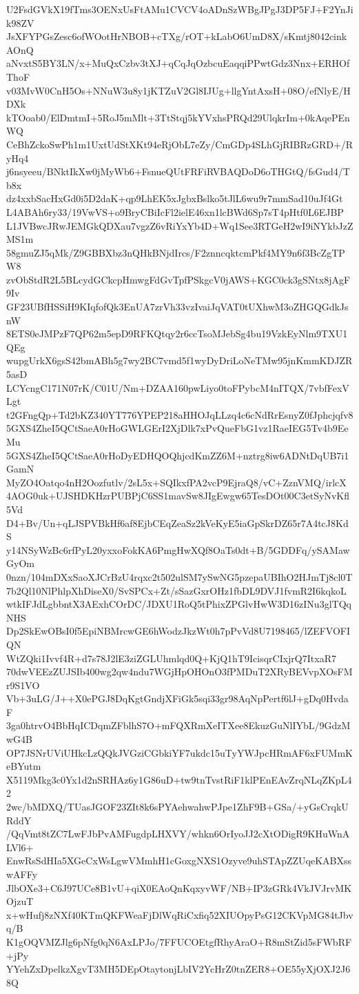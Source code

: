 U2FsdGVkX19fTms3OENxUsFtAMu1CVCV4oADnSzWBgJPgJ3DP5FJ+F2YnJik98ZV
JsXFYPGsZesc6ofWOotHrNBOB+cTXg/rOT+kLabO6UmD8X/sKmtj8042cinkAOnQ
aNvxtS5BY3LN/x+MuQxCzbv3tXJ+qCqJqOzbcuEaqqiPPwtGdz3Nnx+ERHOfThoF
v03MvW0CnH5Os+NNuW3u8y1jKTZuV2Gl8IJUg+llgYntAxsH+08O/efNlyE/HDXk
kTOoab0/ElDmtmI+5RoJ5mMlt+3TtStqj5kYVxhsPRQd29UlqkrIm+0kAqePEnWQ
CeBhZckoSwPh1m1UxtUdStXKt94eRjObL7eZy/CmGDp4SLhGjRIBRzGRD+/RyHq4
j6nsyeeu/BNktIkXw0jMyWb6+FsnueQUtFRFiRVBAQDoD6oTHGtQ/fsGud4/Tb8x
dz4xxbSacHxGd0i5D2daK+qp9LhEK5xJgbxBslko5tJlL6wu9r7mmSad10uJf4Gt
L4ABAh6ry33/19VwVS+o9BryCBiIcFl2ielE46xn1lcBWd6Sp7sT4pHtf0L6EJBP
L1JVBwcJRwJEMGkQDXau7vgzZ6vRiYxYb4D+Wq1See3RTGeH2wI9iNYkbJzZMS1m
58gmuZJ5qMk/Z9GBBXbz3nQHkBNjdIrcs/F2znncqktcmPkf4MY9n6f3BcZgTPW8
zvObStdR2L5BLcydGCkcpHmwgFdGvTpfPSkgcV0jAWS+KGC0ck3gSNtx8jAgF9Iv
GF23UBfHSSiH9KIqfofQk3EnUA7zrVh33vzIvaiJqVAT0tUXhwM3oZHGQGdkJsnW
8ETS0eJMPzF7QP62m5epD9RFKQtqy2r6ccTsoMJebSg4bu19VzkEyNlm9TXU1QEg
wupgUrkX6gsS42bmABh5g7wy2BC7vmd5f1wyDyDriLoNeTMw95jnKmmKDJZR5asD
LCYcngC171N07rK/C01U/Nm+DZAA160pwLiyo0toFPybcM4nITQX/7vbfFexVLgt
t2GFngQp+Td2bKZ340YT776YPEP218aHHOJqLLzq4c6cNdRrEsnyZ0fJphcjqfv8
5GXS4ZheI5QCtSaeA0rHoGWLGErI2XjDlk7xPvQueFbG1vz1RaeIEG5Tv4b9EeMu
5GXS4ZheI5QCtSaeA0rHoDyEDHQOQhjcdKmZZ6M+nztrg8iw6ADNtDqUB7i1GamN
MyZO4Oatqo4nH2Oozfutlv/2sL5x+SQIkxfPA2vcP9EjraQ8/vC+ZznVMQ/irlcX
4AOG0uk+UJSHDKHzrPUBPjC6SS1mavSw8JIgEwgw65TesDOt00C3etSyNvKfl5Vd
D4+Bv/Un+qLJSPVBkHf6af8EjbCEqZeaSz2kVeKyE5iaGpSkrDZ65r7A4tcJ8KdS
y14NSyWzBc6rfPyL20yxxoFokKA6PmgHwXQf8OaTs0dt+B/5GDDFq/ySAMawGyOm
0nzn/104mDXxSaoXJCrBzU4rqxc2t502ulSM7ySwNG5pzepaUBIhO2HJmTj8cl0T
7b2Ql10NlPhlpXhDiseX0/SvSPCx+Zt/sSazGxrOHz1fbDL9DVJ1fvmR2I6kqkoL
wtkIFJdLgbbntX3AExhCOrDC/JDXU1RoQ5tPhixZPGlvHwW3D16zINu3glTQqNHS
Dp2SkEwOBsI0f5EpiNBMrcwGE6hWodzJkzWt0h7pPvVd8U7198465/lZEFVOFIQN
WtZQki1Ivvf4R+d7s78J2lE3ziZGLUhmlqd0Q+KjQ1hT9IcisqrCIxjrQ7ItxaR7
70dwVEEzZUJSIb400wg2qw4ndu7WGjHpOHOnO3fPMDuT2XRyBEVvpXOsFMr9S1VO
Vb+3uLG/J++X0ePGJ8DqKgtGndjXFiGk5sqi33gr98AqNpPertf6lJ+gDq0HvdaF
3ga0htrvO4BbHqICDqmZFblhS7O+mFQXRmXeITXee8EkuzGuNlIYbL/9GdzMwG4B
OP7JSNrUViUHkcLzQQkJVGziCGbkiYF7ukdc15uTyYWJpcHRmAF6xFUMmKeBYutm
X5119Mkg3c0Yx1d2nSRHAz6y1G86uD+tw9tnTvstRiF1klPEnEAvZrqNLqZKpL42
2wc/bMDXQ/TUasJGOF23ZIt8k6sPYAehwahwPJpe1ZhF9B+GSa/+yGsCrqkURddY
/QqVmt8tZC7LwFJbPvAMFugdpLHXVY/whkn6OrIyoJJ2cXtODigR9KHuWnALVl6+
EnwRsSdHIa5XGeCxWsLgwVMmhH1cGoxgNXS1Ozyve9uhSTApZZUqeKABXsswAFFy
JlbOXe3+C6J97UCe8B1vU+qiX0EAoQnKqxyvWF/NB+IP3zGRk4VkJVJrvMKOjzuT
x+wHufj8zNXf40KTmQKFWeaFjDlWqRiCxfiq52XIUOpyPsG12CKVpMG84tJbvq/B
K1gOQVMZJlg6pNfg0qN6AxLPJo/7FFUCOEtgfRhyAraO+R8mStZid5sFWbRF+jPy
YYehZxDpelkzXgvT3MH5DEpOtaytonjLbIV2YcHrZ0tnZER8+OE55yXjOXJ2J68Q

